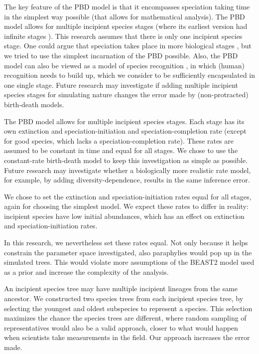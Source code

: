 \documentclass{article}
\begin{document}
The key feature of the PBD model is that it encompasses speciation taking time in the
simplest way possible (that allows for mathematical analysis). The PBD model allows for
multiple incipient species stages (where its earliest version had infinite
stages \cite{rosindell2010protracted}). This research assumes that there is only one
incipient species stage. One could argue that speciation takes place in more
biological stages , but we tried to use the simplest incarnation of the PBD possible.
Also, the PBD model can also be viewed as a model of species recognition ,
in which (human) recognition needs to build up, which we consider to be sufficiently
encapsulated in one single stage. Future research may investigate if adding multiple incipient
species stages for simulating nature changes the error made by (non-protracted) birth-death models.


The PBD model allows for multiple incipient species stages. 
Each stage has its own extinction and speciation-initiation and 
speciation-completion rate (except for good species, which lacks 
a speciation-completion rate). These rates are assumed to be constant
in time and equal for all stages. We chose to use the constant-rate
birth-death model to keep this investigation as simple as possible.
Future research may investigate whether a biologically more realistic
rate model, for example, by adding diversity-dependence, results in
the same inference error.

We chose to set the extinction and speciation-initiation rates equal for all stages,
again for choosing the simplest model. We expect these rates to differ in reality:
incipient species have low initial abundances, which has an effect on extinction
and speciation-initiation rates. 

In this research, we nevertheless set these rates equal. 
Not only because it helps constrain the parameter space investigated,
also paraphylies would pop up in the simulated trees. This would violate more assumptions
of the BEAST2 model used as a prior and increase the complexity of the analysis.


An incipient species tree may have multiple incipient lineages from the
same ancestor. We constructed two species trees from each incipient species
tree, by selecting the youngest and oldest subspecies to represent a species.
This selection maximizes the chance the species trees are different, where
random sampling of representatives would also be a valid approach, closer
to what would happen when scientists take measurements in the field. Our
approach increases the error made.
\end{document}
